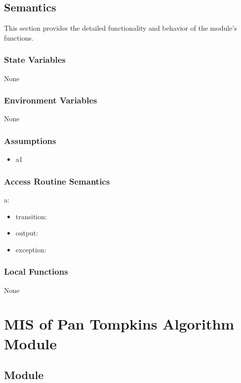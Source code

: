 \documentclass[12pt, titlepage]{article}
\begin{document}
\subsection{Semantics}

This section provides the detailed functionality and behavior of the module’s
functions.

\subsubsection{State Variables}

None

\subsubsection{Environment Variables}

None

\subsubsection{Assumptions}

\begin{itemize}
\item a1
\end{itemize}

\subsubsection{Access Routine Semantics}

\noindent a:
\begin{itemize}
\item transition: 
\item output: 
\item exception: 
\end{itemize}

\subsubsection{Local Functions}

None

\newpage

\section{MIS of Pan Tompkins Algorithm Module} \label{MIS_Alg}

\subsection{Module}
\end{document}
